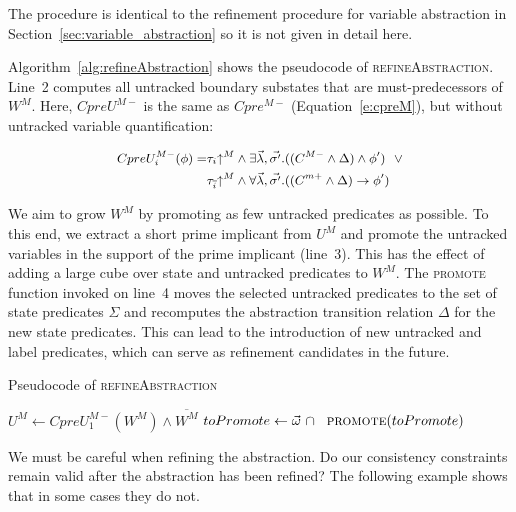 The procedure is identical to the refinement procedure for variable abstraction in Section~\ref{sec:variable_abstraction} so it is not given in detail here.

Algorithm~\ref{alg:refineAbstraction} shows the pseudocode of \textsc{refineAbstraction}.  Line~2 computes all untracked boundary substates that are must-predecessors of $W^M$.  Here, $CpreU^{M-}$ is the same as $Cpre^{M-}$ (Equation~\ref{e:cpreM}), but without untracked variable quantification:

$$
    \small
\begin{aligned}
    CpreU_i^{M-}(\phi) = &\tau_i\mathord{\uparrow^M}         \land \exists \vec{\lambda},\vec{\sigma'}. ((C^{M-} \land \Delta) \land \phi')
                          ~~\lor\\
                         &\tau_{\overline{i}}\mathord{\uparrow^M} \land \forall \vec{\lambda},\vec{\sigma'}. ((C^{m+} \land \Delta) \rightarrow \phi')
\end{aligned}
$$

We aim to grow  $W^M$ by promoting as few untracked predicates as possible.  To this end, we extract a short prime implicant from $U^M$ and promote the untracked variables in the support of the prime implicant (line~3).  This has the effect of adding a large cube over state and untracked predicates to $W^M$. The \textsc{promote} function invoked on line~4 moves the selected untracked predicates to the set of state predicates $\Sigma$ and recomputes the abstraction transition relation $\Delta$ for the new state predicates.  This can lead to the introduction of new untracked and label predicates, which can serve as refinement candidates in the future.

\begin{algorithm}[t]

\caption{Pseudocode of \textsc{refineAbstraction}}
\label{alg:refineAbstraction}

\begin{algorithmic}[1]

    \State $U^M \gets CpreU_1^{M-}(W^M) \land \overline{W^M}$
    \State $toPromote \gets \vec{\omega}~\cap~$
    \State $\Call{promote}{toPromote}$
\EndFunction

\end{algorithmic}
\end{algorithm}

We must be careful when refining the abstraction. Do our consistency constraints remain valid after the abstraction has been refined? The following example shows that in some cases they do not.

